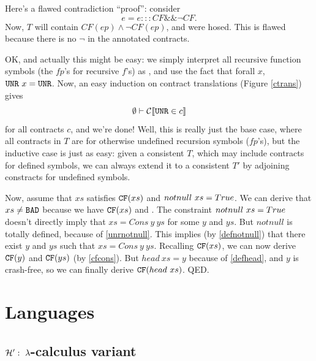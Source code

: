 \documentclass[preprint]{sigplanconf}
\begin{document}
{  Here's a flawed contradiction ``proof'': consider
  \[
  e = e ::: CF \&\& \lnot CF.
  \]
  Now, $T$ will contain $CF(ep) \land \lnot CF(ep)$, and were hosed.
  This is flawed because there is no $\lnot$ in the annotated
  contracts.

  OK, and actually this might be easy: we simply interpret all
  recursive function symbols (the $fp$'s for recursive $f$'s) as
  \unr{}, and use the fact that forall $x$, $\texttt{UNR}{}~x = \texttt{UNR}$.  Now,
  an easy induction on contract translations (Figure \ref{ctrans})
  gives \[ \emptyset \vdash \mathcal{C} \llbracket \texttt{UNR} \in c \rrbracket \] for all contracts $c$, and we're done!  Well, this is really just
  the base case, where all contracts in $T$ are for otherwise
  undefined recursion symbols ($fp$'s), but the inductive case is just
  as easy: given a consistent $T$, which may include contracts for
  defined symbols, we can always extend it to a consistent $T'$ by
  adjoining constracts for undefined symbols.

}

Now, assume that $xs$ satisfies
$\texttt{CF}(xs)$ and $notnull~xs = True$.  We can derive that $xs \neq \texttt{BAD}$
because we have $\texttt{CF}(xs)$ and . The constraint
$notnull~xs = True$ doesn't directly imply that $xs = Cons~y~ys$ for
some $y$ and $ys$. But $notnull$ is totally defined, because of
\eqref{unrnotnull}. This implies (by \eqref{defnotnull}) that there exist
$y$ and $ys$ such that $xs = Cons~y~ys$. Recalling $\texttt{CF}(xs)$, we can
now derive $\texttt{CF}(y)$ and $\texttt{CF}(ys)$ (by \eqref{cfcons}). But $head~xs =
y$ because of \eqref{defhead}, and $y$ is crash-free, so we can finally
derive $\texttt{CF}(head~xs)$. QED.


\section{Languages}
\subsection{$\mathcal{H}':~\lambda$-calculus variant}
\end{document}
